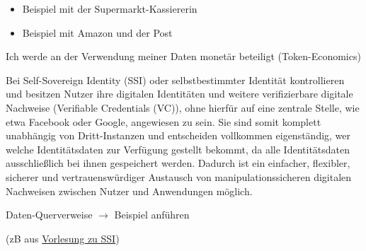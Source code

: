\vspace{0.3cm}


\begin{Solution}

\begin{itemize}
  \item Beispiel mit der Supermarkt-Kassiererin
  \item Beispiel mit Amazon und der Post
\end{itemize}

\end{Solution}

\vspace{0.3cm}


\begin{Solution}

Ich werde an der Verwendung meiner Daten monetär beteiligt (Token-Economics)

\end{Solution}

\vspace{0.3cm}


\begin{Solution}

Bei Self-Sovereign Identity (SSI) oder selbstbestimmter Identität kontrollieren und besitzen Nutzer ihre digitalen Identitäten und weitere verifizierbare digitale Nachweise (Verifiable Credentials (VC)), ohne hierfür auf eine zentrale Stelle, wie etwa Facebook oder Google, angewiesen zu sein. Sie sind somit komplett unabhängig von Dritt-Instanzen und entscheiden vollkommen eigenständig, wer welche Identitätsdaten zur Verfügung gestellt bekommt, da alle Identitätsdaten ausschließlich bei ihnen gespeichert werden. Dadurch ist ein einfacher, flexibler, sicherer und vertrauenswürdiger Austausch von manipulationssicheren digitalen Nachweisen zwischen Nutzer und Anwendungen möglich.

\end{Solution}

\vspace{0.3cm}


\begin{Solution}

Daten-Querverweise $\rightarrow$ Beispiel anführen 

(zB aus \href{https://norbert-pohlmann.com/glossar-cyber-sicherheit/self-sovereign-identity-ssi/}{Vorlesung zu SSI})

\end{Solution}

\vspace{0.5cm}